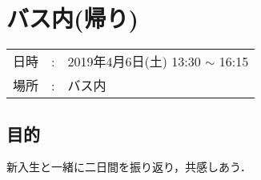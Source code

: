 %

\section{バス内(帰り)}

\begin{tabular}{p{}rp{}}
  日時 & : & 2019年4月6日(土) 13:30 $\sim$ 16:15\\
  場所 & : & バス内
\end{tabular}

\subsection{目的}
新入生と一緒に二日間を振り返り，共感しあう．


